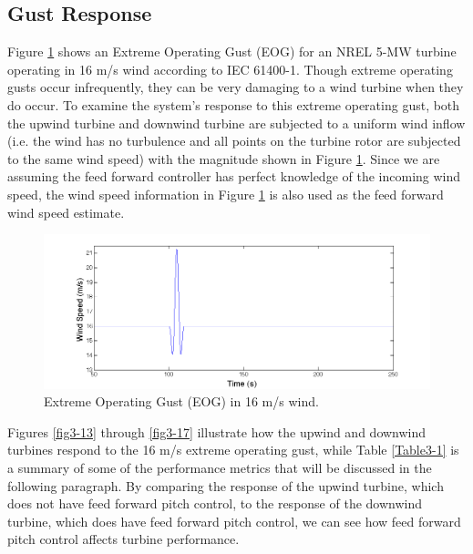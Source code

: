 \subsection{Gust Response}\label{section3-4-1}

Figure \ref{fig3-12} shows an Extreme Operating Gust (EOG) for an NREL 5-MW turbine operating in 16 m/s wind according to IEC 61400-1.\cite{IEC2005} Though extreme operating gusts occur infrequently, they can be very damaging to a wind turbine when they do occur. To examine the system's response to this extreme operating gust, both the upwind turbine and downwind turbine are subjected to a uniform wind inflow (i.e. the wind has no turbulence and all points on the turbine rotor are subjected to the same wind speed) with the magnitude shown in Figure \ref{fig3-12}. Since we are assuming the feed forward controller has perfect knowledge of the incoming wind speed, the wind speed information in Figure \ref{fig3-12} is also used as the feed forward wind speed estimate.


\begin{figure}[htb]
	\centering
		\includegraphics[width = \linewidth]{Figures/ch3Figures/fig3-12.png}
	\caption{Extreme Operating Gust (EOG) in 16 m/s wind.}
	\label{fig3-12}
\end{figure}


Figures \ref{fig3-13} through \ref{fig3-17} illustrate how the upwind and downwind turbines respond to the 16 m/s extreme operating gust, while Table \ref{Table3-1} is a summary of some of the performance metrics that will be discussed in the following paragraph. By comparing the response of the upwind turbine, which does not have feed forward pitch control, to the response of the downwind turbine, which does have feed forward pitch control, we can see how feed forward pitch control affects turbine performance.

